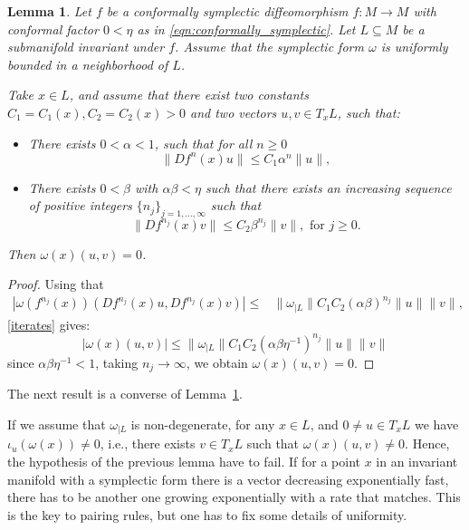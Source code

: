 \documentclass[11pt]{amsart}
\newtheorem{lem}[thm]{Lemma}
\theoremstyle{definition}
\theoremstyle{remark}
\numberwithin{equation}{section}
\begin{document}
\begin{lem}\label{lem:vanishing_pairing}
Let $f$ be  a conformally symplectic  diffeomorphism $f:M\to M$ with conformal factor $0<\eta$ as in  \eqref{eqn:conformally_symplectic}.
Let $L\subseteq M$ be a submanifold invariant under $f$.
Assume that the symplectic form $\omega$ is  uniformly bounded in a neighborhood of $L$.


Take $x\in L$,  and assume that there exist two constants  $C_1=C_1(x),C_2=C_2(x)>0$ and  two vectors $u,v\in T_x L$, such that:


\begin{itemize}
\item [(A1)]
There exists $0<\alpha<1$, such that for all $n\geq 0$
\begin{equation}
\|Df^n(x)u\|\leq C_1\alpha^n\|u\|,
\end{equation}
\item [(A2)]
There exists   $0<\beta$ with $\alpha\beta<\eta$ such that there exists an increasing sequence of positive integers
 $\{n_j\}_{j=1,\ldots,\infty}$ such that
\begin{equation}
\|Df^{n_j}(x)v\|\leq C_2\beta^{n_j}\|v\|, \textrm{ for } j\geq 0.
\end{equation}
\end{itemize}
Then $\omega (x)(u,v)=0$.
\end{lem}

\begin{proof}
Using  that
\begin{equation}\begin{split}
|\omega(f^{n_j}(x))(Df^{n_j}(x)u,Df^{n_j}(x)v)|\le &\|\omega_{\mid L}\| C_1 C_2(\alpha\beta)^{n_j}\|u\|\|v\| ,
\end{split}\end{equation}
\eqref{iterates}  gives:
\[
|\omega(x)(u,v)|\le \|\omega_{\mid L}\| C_1 C_2(\alpha\beta\eta^{-1})^{n_j}\|u\|\|v\|
\]
since $\alpha\beta\eta^{-1}<1$, taking $n_j\to \infty$, we obtain $\omega (x)(u,v)=0$.
\end{proof}




The next result is a converse of Lemma~\ref{lem:vanishing_pairing}.

If we assume that $\omega_{\mid L}$ is non-degenerate, for any $x\in L$, and $0\neq u\in T_xL$ we have $\iota_u(\omega (x))\neq 0$, i.e.,  there exists $v\in T_xL$ such that $\omega(x)(u,v)\neq 0$.
Hence, the hypothesis of the previous lemma have to fail.
If for a point $x$  in an invariant  manifold with
a symplectic form there is a vector decreasing exponentially fast,
there has to be another one growing exponentially with a rate that matches.
This is the key to pairing rules, but one has to fix some details of uniformity.
\end{document}
